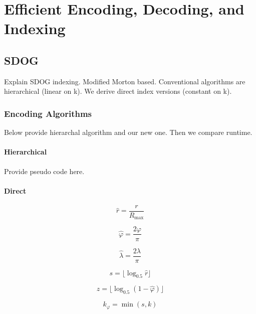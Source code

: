 \chapter{Efficient Encoding, Decoding, and Indexing} \label{chap:coding}

\section{SDOG}

Explain SDOG indexing.
Modified Morton based.
Conventional algorithms are hierarchical (linear on k).
We derive direct index versions (constant on k).

\subsection{Encoding Algorithms}
Below provide hierarchal algorithm and our new one.
Then we compare runtime.

\subsubsection{Hierarchical}
Provide pseudo code here.

\subsubsection{Direct}

\begin{equation*}
\hat{r} = \frac{r}{R_\mathrm{max}}
\end{equation*}

\begin{equation*}
\hat{\varphi} = \frac{2 \varphi}{\pi}
\end{equation*}

\begin{equation*}
\hat{\lambda} = \frac{2 \lambda}{\pi}
\end{equation*}

\begin{equation*}
s = \lfloor \log_{0.5} \hat{r} \rfloor
\end{equation*}

\begin{equation*}
z = \lfloor \log_{0.5} ( 1 - \hat{\varphi} ) \rfloor
\end{equation*}

\begin{equation*}
k_\varphi = \min ( s, k )
\end{equation*}

